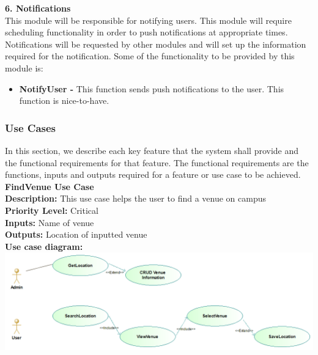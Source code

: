 \documentclass[a4paper,12pt]{article}
\begin{document}
\textbf{6. Notifications}\\
This module will be responsible for notifying users. This module will require scheduling functionality in order to push notifications at appropriate times. Notifications will be requested by other modules and will set up the information required for the notification. Some of the functionality to be provided by this module is:
\begin{itemize}
\item \textbf{NotifyUser -} This function sends push notifications to the user. This function is nice-to-have.
\end{itemize}

\subsubsection{Use Cases}
In this section, we describe each key feature that the system shall provide and the functional requirements for that feature. The functional requirements are the functions, inputs and outputs required for a feature or use case to be achieved. \\

\textbf{\large FindVenue Use Case}\\
\textbf{Description: } This use case helps the user to find a venue on campus\\
\textbf{Priority Level: } Critical\\
\textbf{Inputs:} Name of venue\\
\textbf{Outputs:} Location of inputted venue\\
\textbf{Use case diagram: }\\
\includegraphics[width=\textwidth]{images/find_venue.png}
\end{document}
